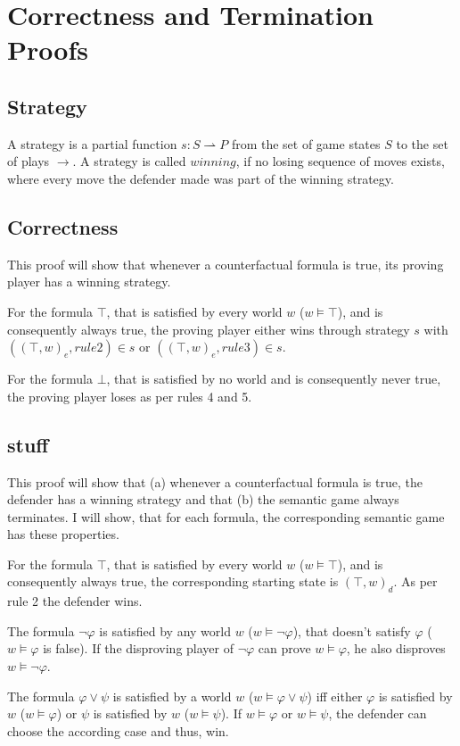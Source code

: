 \documentclass[a4paper,american]{paper}
\theoremstyle{definition}\newtheorem{definition}{Definition}
\begin{document}
\section*{Correctness and Termination Proofs}
\subsection{Strategy}
A strategy is a partial function $s: S\rightharpoonup P$ from the set of game states $S$ to the set of plays $\rightarrow$.
A strategy is called $winning$, if no losing sequence of moves exists, where every move the defender made was part of the winning strategy.
\subsection{Correctness}
This proof will show that whenever a counterfactual formula is true, its proving player has a winning strategy.

For the formula $\top$, that is satisfied by every world $w$ ($w\vDash\top$), and is consequently always true, the proving player either wins through strategy $s$ with $((\top, w)_e, rule 2)\in s$ or $((\top, w)_e, rule 3)\in s$.

For the formula $\bot$, that is satisfied by no world and is consequently never true, the proving player loses as per rules 4 and 5.

\subsection{stuff}
This proof will show that (a) whenever a counterfactual formula is true, the defender has a winning strategy and that (b) the semantic game always terminates. I will show, that for each formula, the corresponding semantic game has these properties.

For the formula $\top$, that is satisfied by every world $w$ ($w\vDash\top$), and is consequently always true, the corresponding starting state is $(\top , w)_d$. As per rule 2 the defender wins.

The formula $\neg\varphi$ is satisfied by any world $w$ ($w\vDash\neg\varphi$), that doesn't satisfy $\varphi$ ($w\vDash\varphi$ is false). If the disproving player of $\neg\varphi$ can prove $w\vDash\varphi$, he also disproves $w\vDash\neg\varphi$.

The formula $\varphi\vee\psi$ is satisfied by a world $w$ ($w\vDash\varphi\vee\psi$) iff either $\varphi$ is satisfied by $w$ ($w\vDash\varphi$) or $\psi$ is satisfied by $w$ ($w\vDash\psi$). If $w\vDash\varphi$ or $w\vDash\psi$, the defender can choose the according case and thus, win.
\end{document}
